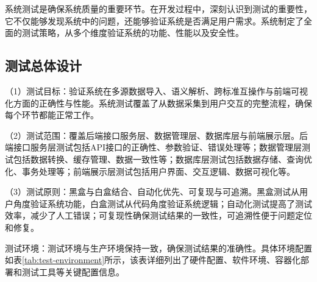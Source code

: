 系统测试是确保系统质量的重要环节。在开发过程中，深刻认识到测试的重要性，它不仅能够发现系统中的问题，还能够验证系统是否满足用户需求。系统制定了全面的测试策略，从多个维度验证系统的功能、性能以及安全性。

\subsection{测试总体设计}

（1）测试目标：验证系统在多源数据导入、语义解析、跨标准互操作与前端可视化方面的正确性与性能。系统测试覆盖了从数据采集到用户交互的完整流程，确保每个环节都能正常工作。

（2）测试范围：覆盖后端接口服务层、数据管理层、数据库层与前端展示层。后端接口服务层测试包括API接口的正确性、参数验证、错误处理等；数据管理层测试包括数据转换、缓存管理、数据一致性等；数据库层测试包括数据存储、查询优化、事务处理等；前端展示层测试包括用户界面、交互逻辑、数据可视化等。

（3）测试原则：黑盒与白盒结合、自动化优先、可复现与可追溯。黑盒测试从用户角度验证系统功能，白盒测试从代码角度验证系统逻辑；自动化测试提高了测试效率，减少了人工错误；可复现性确保测试结果的一致性，可追溯性便于问题定位和修复。

测试环境：测试环境与生产环境保持一致，确保测试结果的准确性。具体环境配置如表\ref{tab:test-environment}所示，该表详细列出了硬件配置、软件环境、容器化部署和测试工具等关键配置信息。

\begin{table}[H]
\centering
\caption{系统测试环境配置}
\label{tab:test-environment}
\end{table}

